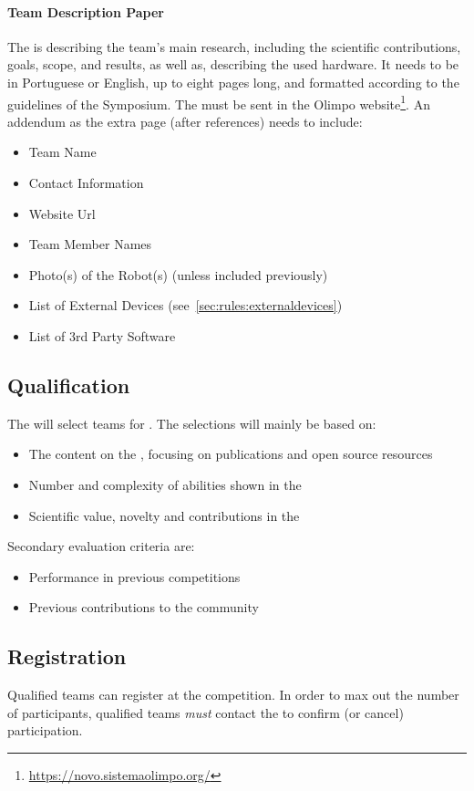 \paragraph{Team Description Paper}
\label{sec:rules:application:tdp}
The \TDP{} is describing the team's main research, including the scientific contributions, goals, scope, and results, as well as, describing the used hardware. It needs to be in Portuguese or English, up to eight pages long, and formatted according to the guidelines of the \RoboCup{} Symposium. 
The \TDP{} must be sent in the Olimpo website\footnote{\url{https://novo.sistemaolimpo.org/}}.
An addendum as the extra page (after references) needs to include:
\begin{itemize}
	\item Team Name
	\item Contact Information
	\item Website Url
	\item Team Member Names
	\item Photo(s) of the Robot(s) (unless included previously) 
	\item List of External Devices (see~\ref{sec:rules:externaldevices})
	\item List of 3rd Party Software
\end{itemize}

\subsection{Qualification}
\label{sec:rules:qualification}
The \OC{} will select teams for \Qualification{}. The selections will mainly be based on:
\begin{itemize}
	\item The content on the \TeamWebsite{}, focusing on publications and open source resources
	\item Number and complexity of abilities shown in the \TeamVideo{}
	\item Scientific value, novelty and contributions in the \TDP{}

\end{itemize}
Secondary evaluation criteria are:
\begin{itemize}
	\item Performance in previous competitions
	\item Previous contributions to the \AtHome{} community
\end{itemize}


\subsection{Registration}
\label{sec:rules:registration}
Qualified teams can register at the \RoboCup\AtHome{} competition. In order to max out the number of participants, qualified teams \emph{must} contact the \OC{} to confirm (or cancel) participation.

